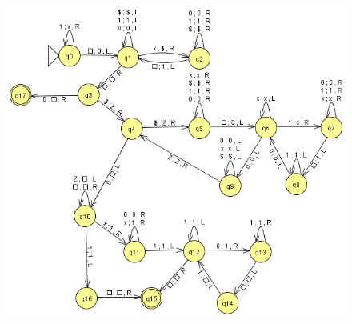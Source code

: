 \documentclass[12pt]{article}
\begin{document}
\begin{spacing}{1.5}
\begin{enumerate}
\begin{enumerate}
                              \begin{figure}[h!]
                                    \centering
                                    \includegraphics[width=1\textwidth]{img/q4/q4b.png}
                              \end{figure}

                  \end{enumerate}

      \end{enumerate}

\end{spacing}
\end{document}
